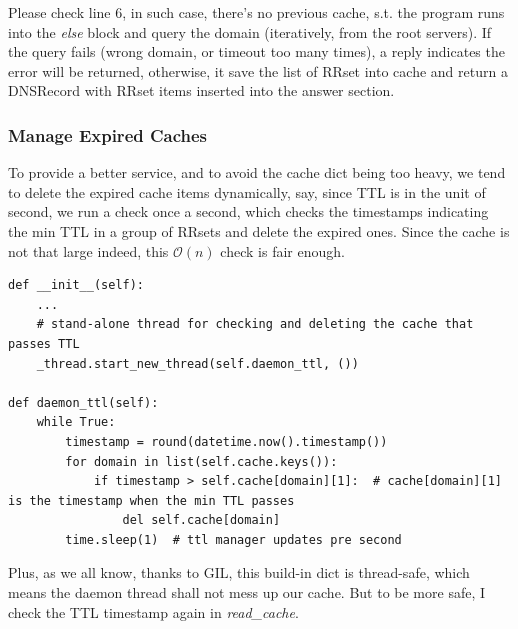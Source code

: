 \documentclass[onecolumn, oneside, ctexart]{SUSTechHomework}
\begin{document}
Please check line 6, in such case, there's no previous cache, s.t. the program runs into the \emph{else} block and query the domain (iteratively, from the root servers). If the query fails (wrong domain, or timeout too many times), a reply indicates the error will be returned, otherwise, it save the list of RRset into cache and return a DNSRecord with RRset items inserted into the answer section.

\subsubsection{Manage Expired Caches}
To provide a better service, and to avoid the cache dict being too heavy, we tend to delete the expired cache items dynamically, say, since TTL is in the unit of second, we run a check once a second, which checks the timestamps indicating the min TTL in a group of RRsets and delete the expired ones. Since the cache is not that large indeed, this $\mathcal{O}(n)$ check is fair enough.
\begin{verbatim}
def __init__(self):
    ...
    # stand-alone thread for checking and deleting the cache that passes TTL
    _thread.start_new_thread(self.daemon_ttl, ())

def daemon_ttl(self):
    while True:
        timestamp = round(datetime.now().timestamp())
        for domain in list(self.cache.keys()):
            if timestamp > self.cache[domain][1]:  # cache[domain][1] is the timestamp when the min TTL passes
                del self.cache[domain]
        time.sleep(1)  # ttl manager updates pre second
\end{verbatim}
Plus, as we all know, thanks to GIL, this build-in dict is thread-safe, which means the daemon thread shall not mess up our cache. But to be more safe, I check the TTL timestamp again in \emph{read\_cache}.
\end{document}
